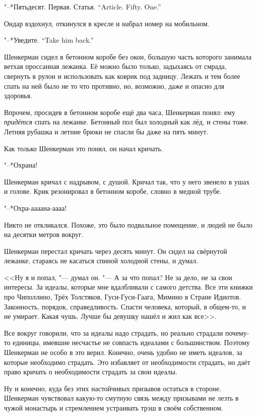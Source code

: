 {"--*Пятьдесят. Первая. Статья.}
{``Article. Fifty. One.''}

Ондар вздохнул, откинулся в кресле и набрал номер на мобильном.

{"--*Уведите.}
{``Take him back.''}

\asterism

Шенкерман сидел в бетонном коробе без окон, большую часть которого занимала ветхая проссанная лежанка.
Её можно было только, задыхаясь от смрада, свернуть в рулон и использовать как коврик под задницу.
Лежать и тем более спать на ней было не то что противно, но, возможно, даже и опасно для здоровья.

Впрочем, просидев в бетонном коробе ещё два часа, Шенкерман понял: ему \textit{придётся} спать на лежанке.
Бетонный пол был холодный как лёд, и стены тоже.
Летняя рубашка и летние брюки не спасли бы даже на пять минут.

Как только Шенкерман это понял, он начал кричать.

"--*Охрана!

Шенкерман кричал с надрывом, с душой.
Кричал так, что у него звенело в ушах и голове.
Крик резонировал в бетонном коробе, словно в медной трубе.

"--*Охра-аааана-аааа!

Никто не откликался.
Похоже, это было подвальное помещение, и людей не было на десятки метров вокруг.

Шенкерман перестал кричать через десять минут.
Он сидел на свёрнутой лежанке, стараясь не касаться спиной холодной стены, и думал.

<<Ну я и попал, "--- думал он.
"--- А за что попал?
Не за дело, не за свои интересы.
За идеалы, которые мне вдалбливали с самого детства.
Все эти книжки про Чиполлино, Трёх Толстяков, Гуси-Гуси-Гаага, Мимино в Стране Идиотов.
Законность, порядок, справедливость.
Спасти человека, который, в общем-то, и не умирает.
Какая чушь.
Лучше бы девушку нашёл и жил как все>>.

Все вокруг говорили, что за идеалы надо страдать, но реально страдали почему-то единицы, имевшие несчастье не совпасть идеалами с большинством.
Поэтому Шенкерман не особо в это верил.
Конечно, очень удобно не иметь идеалов, за которые необходимо страдать.
Это избавляет от необходимости страдать, но даёт право кричать о необходимости страдать за свои идеалы.

Ну и конечно, куда без этих настойчивых призывов остаться в стороне.
Шенкерман чувствовал какую-то смутную связь между призывами не лезть в чужой монастырь и стремлением устраивать трэш в своём собственном.


